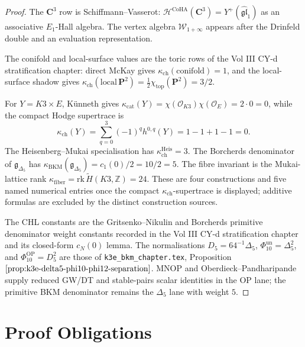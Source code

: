 \documentclass[11pt]{amsart}
\theoremstyle{definition}
\providecommand{\kch}{\kappa_{\mathrm{ch}}}
\providecommand{\kcat}{\kappa_{\mathrm{cat}}}
\providecommand{\kBKM}{\kappa_{\mathrm{BKM}}}
\providecommand{\kfib}{\kappa_{\mathrm{fiber}}}
\providecommand{\CoHA}{\mathcal{H}^{\mathrm{CoHA}}}
\providecommand{\fg}{\mathfrak{g}}
\providecommand{\cO}{\mathcal{O}}
\providecommand{\bC}{\mathbf{C}}
\providecommand{\bP}{\mathbf{P}}
\providecommand{\Eone}{E_1}
\begin{document}
\begin{proof}
The \(\bC^3\) row is Schiffmann--Vasserot:
\(\CoHA(\bC^3)=Y^+(\widehat{\mathfrak{gl}}_1)\) as an associative
\(\Eone\)-Hall algebra.  The vertex algebra
\(\mathcal W_{1+\infty}\) appears after the Drinfeld double and an
evaluation representation.

The conifold and local-surface values are the toric rows of the Vol III
CY-d stratification chapter: direct McKay gives
\(\kch(\mathrm{conifold})=1\), and the local-surface shadow gives
\(\kch(\mathrm{local}\,\bP^2)=\frac12\chi_{\mathrm{top}}(\bP^2)=3/2\).

For \(Y=K3\times E\), K\"unneth gives
\(\kcat(Y)=\chi(\cO_{K3})\chi(\cO_E)=2\cdot0=0\), while the compact
Hodge supertrace is
\[
  \kch(Y)=\sum_{q=0}^3(-1)^q h^{0,q}(Y)=1-1+1-1=0.
\]
The Heisenberg--Mukai specialisation has
\(\kappa_{\mathrm{ch}}^{\mathrm{Heis}}=3\).  The Borcherds denominator
of \(\fg_{\Delta_5}\) has
\(\kBKM(\fg_{\Delta_5})=c_1(0)/2=10/2=5\).  The fibre invariant is the
Mukai-lattice rank \(\kfib=\mathrm{rk}\,\widetilde H(K3,\mathbb Z)=24\).
These are four constructions and five named numerical entries once the
compact \(\kch\)-supertrace is displayed; additive formulas are excluded
by the distinct construction sources.

The CHL constants are the Gritsenko--Nikulin and Borcherds primitive
denominator weight constants recorded in the Vol III CY-d
stratification chapter and its closed-form \(c_N(0)\) lemma.  The
normalisations
\(D_5=64^{-1}\Delta_5\),
\(\Phi_{10}^{\mathrm{un}}=\Delta_5^2\), and
\(\Phi_{10}^{\mathrm{OP}}=D_5^2\) are those of
\texttt{k3e\_bkm\_chapter.tex}, Proposition
\(\ref{prop:k3e-delta5-phi10-phi12-separation}\).
MNOP and Oberdieck--Pandharipande supply reduced GW/DT and stable-pairs
scalar identities in the OP lane; the primitive BKM denominator remains
the \(\Delta_5\) lane with weight \(5\).
\end{proof}

\section{Proof Obligations}
\end{document}
